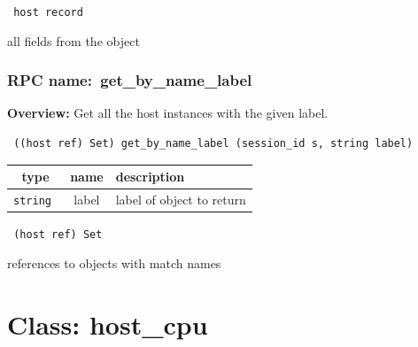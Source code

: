 \vspace{0.3cm}

{\tt 
host record
}


all fields from the object
\vspace{0.3cm}
\vspace{0.3cm}
\vspace{0.3cm}
\subsubsection{RPC name:~get\_by\_name\_label}

{\bf Overview:} 
Get all the host instances with the given label.

\begin{verbatim} ((host ref) Set) get_by_name_label (session_id s, string label)\end{verbatim}



 
\vspace{0.3cm}
\begin{tabular}{|c|c|p{7cm}|}
 \hline
{\bf type} & {\bf name} & {\bf description} \\ \hline
{\tt string } & label & label of object to return \\ \hline 

\end{tabular}

\vspace{0.3cm}

{\tt 
(host ref) Set
}


references to objects with match names
\vspace{0.3cm}
\vspace{0.3cm}
\vspace{0.3cm}

\vspace{1cm}
\newpage
\section{Class: host\_cpu}
